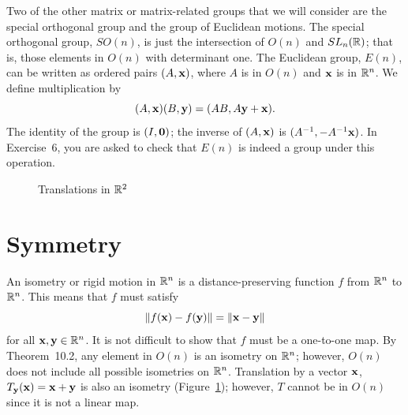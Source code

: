  
 
Two of the other matrix or matrix-related groups that we will consider
are the special orthogonal group  and the group of Euclidean motions.
The {\bfi special orthogonal group},
$SO(n)$\label{notespecialorthog}, is just the intersection of $O(n)$
and $SL_n({\Bbb R})$; that is, those elements in $O(n)$ with determinant
one. The {\bfi Euclidean
group},
$E(n)$\label{noteeuclidgroup}, can be written as ordered pairs $(A,
{\bold x})$, where $A$ is in $O(n)$ and ${\bold x}$ is in ${\Bbb
R}^n$. We define multiplication by
\[
(A, {\bold x}) (B, {\bold y})
=
(AB, A {\bold y} +{\bold x}).
\]
The identity of the group is $(I,{\bold 0})$; the inverse of $(A,
{\bold x})$ is $(A^{-1}, -A^{-1} {\bold x})$. In Exercise~6, you 
are asked to check that $E(n)$ is indeed a group under this operation.
 
 
 
 
\begin{figure}[hbt]

\begin{center}
\end{center}
\caption{Translations in ${\Bbb R}^2$}
\label{Isometries}
\end{figure}
 
 
 
 
 
\section{Symmetry}
 
 
 
 
An {\bfi isometry\/} or {\bfi rigid
motion\/} in ${\Bbb R}^n$  is a
distance-preserving function $f$ from ${\Bbb R}^n$ to ${\Bbb R}^n$.
This means that $f$ must satisfy 
\[
\| f({\bold x}) - f({\bold y}) \| =
\|{\bold x} - {\bold y} \|
\]
for all ${\bold x}, {\bold y} \in {\Bbb R}^n$. It is not difficult to
show that $f$ must be a one-to-one map. By Theorem~10.2, any element in
$O(n)$ is an isometry on ${\Bbb R}^n$; however, $O(n)$ does not
include all possible isometries on ${\Bbb R}^n$. Translation by a
vector ${\bold x}$, $T_{\bold y}({\bold x}) = {\bold x} + {\bold y}$
is also an isometry (Figure~\ref{Isometries}); however, $T$ cannot be
in $O(n)$ since it is not a linear map. 
 
